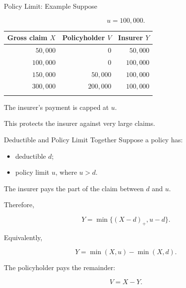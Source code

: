 \documentclass[
  ignorenonframetext,
  aspectratio=169,
]{beamer}
\newcounter{none} %
\providecommand{\tightlist}{%
  \setlength{\itemsep}{0pt}\setlength{\parskip}{0pt}}
\begin{document}
\begin{frame}{Policy Limit: Example}
\protect{}\label{policy-limit-example-1}
Suppose

\[
u=100{,}000.
\]

{\def\LTcaptype{none} %
\begin{longtable}[]{@{}rrr@{}}
\toprule\noalign{}
Gross claim \(X\) & Policyholder \(V\) & Insurer \(Y\) \\
\midrule\noalign{}
\endhead
\(50{,}000\) & \(0\) & \(50{,}000\) \\
\(100{,}000\) & \(0\) & \(100{,}000\) \\
\(150{,}000\) & \(50{,}000\) & \(100{,}000\) \\
\(300{,}000\) & \(200{,}000\) & \(100{,}000\) \\
\bottomrule\noalign{}
\end{longtable}
}

The insurer's payment is capped at \(u\).

This protects the insurer against very large claims.
\end{frame}

\begin{frame}{Deductible and Policy Limit Together}
\protect{}\label{deductible-and-policy-limit-together}
Suppose a policy has:

\begin{itemize}
\tightlist
\item
  deductible \(d\);
\item
  policy limit \(u\), where \(u>d\).
\end{itemize}

The insurer pays the part of the claim between \(d\) and \(u\).

Therefore,

\[
\boxed{
Y=\min\{(X-d)_+,u-d\}.
}
\]

Equivalently,

\[
Y=\min(X,u)-\min(X,d).
\]

The policyholder pays the remainder:

\[
\boxed{V=X-Y}.
\]
\end{frame}
\end{document}
